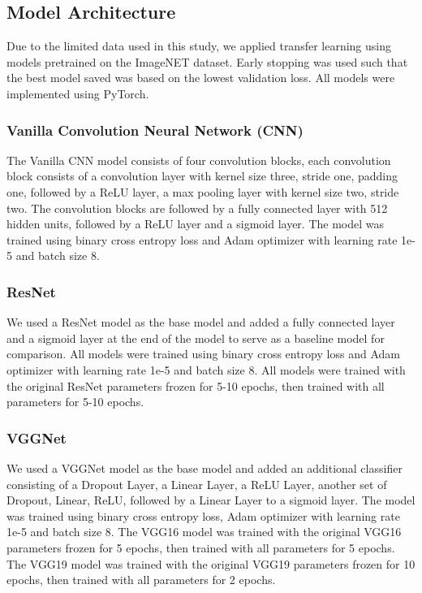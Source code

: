 \documentclass{article} %
\begin{document}
\subsection{Model Architecture}
Due to the limited data used in this study, we applied transfer learning using models pretrained on the ImageNET dataset. Early stopping was used such that the best model saved was based on the lowest validation loss. All models were implemented using PyTorch.

\subsubsection{Vanilla Convolution Neural Network (CNN)}
The Vanilla CNN model consists of four convolution blocks, each convolution block consists of a convolution layer with kernel size three, stride one, padding one, followed by a ReLU layer, a max pooling layer with kernel size two, stride two. The convolution blocks are followed by a fully connected layer with 512 hidden units, followed by a ReLU layer and a sigmoid layer. The model was trained using binary cross entropy loss and Adam optimizer with learning rate 1e-5 and batch size 8.

\subsubsection{ResNet}
We used a ResNet model as the base model and added a fully connected layer and a sigmoid layer at the end of the model to serve as a baseline model for comparison. All models were trained using binary cross entropy loss and Adam optimizer with learning rate 1e-5 and batch size 8. All models were trained with the original ResNet parameters frozen for 5-10 epochs, then trained with all parameters for 5-10 epochs.

\subsubsection{VGGNet}
We used a VGGNet model as the base model and added an additional classifier consisting of a Dropout Layer, a Linear Layer, a ReLU Layer, another set of Dropout, Linear, ReLU, followed by a Linear Layer to a sigmoid layer. The model was trained using binary cross entropy loss,  Adam optimizer with learning rate 1e-5 and batch size 8. The VGG16 model was trained with the original VGG16 parameters frozen for 5 epochs, then trained with all parameters for 5 epochs. The VGG19 model was trained with the original VGG19 parameters frozen for 10 epochs, then trained with all parameters for 2 epochs.
\end{document}
